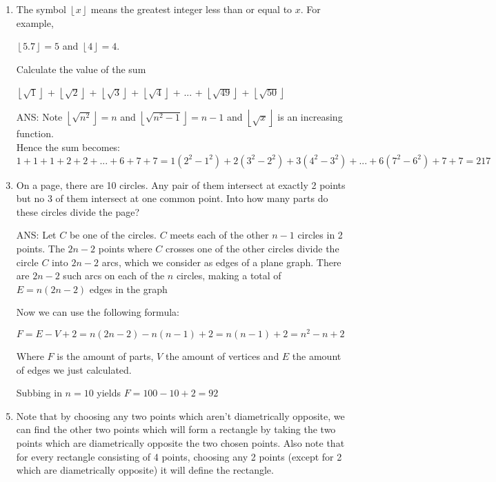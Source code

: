 \documentclass{article}
\begin{document}
\begin{enumerate}[1.]
\vspace{6pt}
\item %
The symbol $\left \lfloor{x}\right \rfloor$ means the greatest integer less than or equal to $x$. For example, 
\begin{center}
	$\left \lfloor{5.7}\right \rfloor = 5$ and $\left \lfloor{4}\right \rfloor = 4$.
\end{center} 
Calculate the value of the sum
\begin{center}
	$\left \lfloor{\sqrt{1}}\right \rfloor$ + $\left \lfloor{\sqrt{2}}\right \rfloor$ + $\left \lfloor{\sqrt{3}}\right \rfloor$ + $\left \lfloor{\sqrt{4}}\right \rfloor$ + ... + $\left \lfloor{\sqrt{49}}\right \rfloor$ + $\left \lfloor{\sqrt{50}}\right \rfloor$
\end{center}
\medskip
\item[ANS:]
Note $\left \lfloor{\sqrt{n^2}}\right\rfloor = n$ and $\left \lfloor{\sqrt{n^2-1}}\right\rfloor = n-1$ and  $\left \lfloor{\sqrt{x}}\right\rfloor$ is an increasing function.\\
Hence the sum becomes:\\
$1 + 1 + 1 + 2 + 2 + ... + 6 + 7 + 7 = 1(2^2-1^2) + 2(3^2-2^2) + 3(4^2-3^2) + ... + 6(7^2-6^2) + 7 + 7 = 217$


\vspace{6pt}
\item %
On a page, there are 10 circles. Any pair of them intersect at exactly 2 points but no 3 of
them intersect at one common point. Into how many parts do these circles divide the page?
\item[ANS:]
Let $C$ be one of the circles. $C$ meets each of the other $n-1$ circles in 2 points. The $2n-2$ points where $C$ crosses one of the other circles divide the circle $C$ into $2n-2$ arcs, which we consider as edges of a plane graph. There are $2n-2$ such arcs on each of the $n$ circles, making a total of $E=n(2n-2)$ edges in the graph

Now we can use the following formula:
\begin{center}
$F=E-V+2=n(2n-2)-n(n-1)+2=n(n-1)+2=n^2-n+2$
\end{center}
Where $F$ is the amount of parts, $V$ the amount of vertices and $E$ the amount of edges we just calculated.

Subbing in $n = 10$ yields $F = 100 - 10 + 2 = 92$


\vspace{6pt}
\item %
Note that by choosing any two points which aren't diametrically opposite, we can find the other two points which will form a rectangle by taking the two points which are diametrically opposite the two chosen points. Also note that for every rectangle consisting of 4 points, choosing any 2 points (except for 2 which are diametrically opposite) it will define the rectangle.


\end{enumerate}
\end{document}
